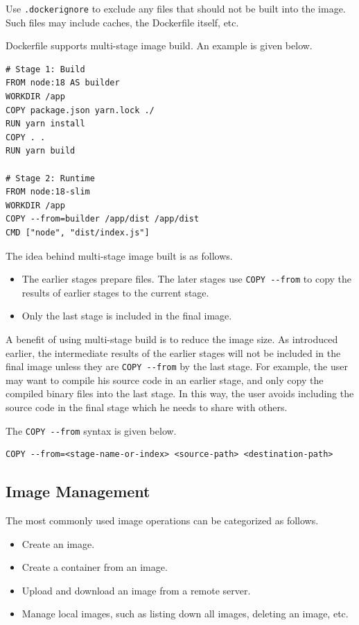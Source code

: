 Use \verb|.dockerignore| to exclude any files that should not be built into the image. Such files may include caches, the Dockerfile itself, etc.

Dockerfile supports multi-stage image build. An example is given below.
\begin{lstlisting}
# Stage 1: Build
FROM node:18 AS builder
WORKDIR /app
COPY package.json yarn.lock ./
RUN yarn install
COPY . .
RUN yarn build

# Stage 2: Runtime
FROM node:18-slim
WORKDIR /app
COPY --from=builder /app/dist /app/dist
CMD ["node", "dist/index.js"]
\end{lstlisting}
The idea behind multi-stage image built is as follows.
\begin{itemize}
  \item The earlier stages prepare files. The later stages use \verb|COPY --from| to copy the results of earlier stages to the current stage.
  \item Only the last stage is included in the final image.
\end{itemize}

A benefit of using multi-stage build is to reduce the image size. As introduced earlier, the intermediate results of the earlier stages will not be included in the final image unless they are \verb|COPY --from| by the last stage. For example, the user may want to compile his source code in an earlier stage, and only copy the compiled binary files into the last stage. In this way, the user avoids including the source code in the final stage which he needs to share with others.

The \verb|COPY --from| syntax is given below.
\begin{lstlisting}
COPY --from=<stage-name-or-index> <source-path> <destination-path>
\end{lstlisting}

\subsection{Image Management}

The most commonly used image operations can be categorized as follows.
\begin{itemize}
  \item Create an image.
  \item Create a container from an image.
  \item Upload and download an image from a remote server.
  \item Manage local images, such as listing down all images, deleting an image, etc.
\end{itemize}

